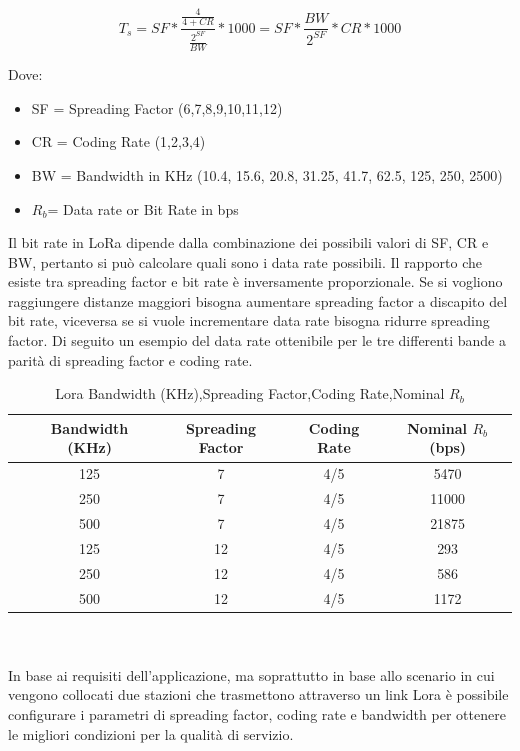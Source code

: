 \documentclass[12pt,a4paper,openright,twoside]{report}
\begin{document}
\begin{equation*} T_s = SF * \frac{\tfrac{4}{4+CR}}{\tfrac{2^{SF}}{BW}} * 1000 = SF * \frac{BW}{2^{SF}} * CR * 1000 \end{equation*}

Dove:
\begin{itemize}                       
\item SF = Spreading Factor (6,7,8,9,10,11,12)
\item CR = Coding Rate (1,2,3,4)
\item BW = Bandwidth in KHz (10.4, 15.6, 20.8, 31.25, 41.7, 62.5, 125, 250, 2500)
\item $R_b$= Data rate or Bit Rate in bps 
\end{itemize}
Il bit rate in LoRa dipende dalla combinazione dei possibili valori di SF, CR e BW, pertanto si pu\`o calcolare quali sono i data rate possibili.
Il rapporto che esiste tra spreading factor e bit rate \`e inversamente proporzionale. Se si vogliono raggiungere distanze maggiori bisogna aumentare spreading factor a discapito del bit rate, viceversa se si vuole incrementare data rate bisogna ridurre spreading factor. Di seguito un esempio del data rate ottenibile per le tre differenti bande a parit\`a di spreading factor e coding rate. 
\\
\begin{table}
\begin{center}
\begin{tabular}{lcccc}
&Bandwidth (KHz)&Spreading Factor&Coding Rate&Nominal $R_b$ (bps)\\ \hline\hline
&125&7&4/5&5470\\
\hline
&250&7&4/5&11000\\
\hline
&500&7&4/5&21875\\
\hline
&125&12&4/5&293\\
\hline
&250&12&4/5&586\\
\hline
&500&12&4/5&1172\\
\hline
\end{tabular}
\caption[Lora Bandwidth (KHz),Spreading Factor,Coding Rate,Nominal $R_b$ ]{Lora Bandwidth (KHz),Spreading Factor,Coding Rate,Nominal $R_b$ }\label{tab:quattro}
\end{center}
\end{table}
\\
\\
In base ai requisiti dell'applicazione, ma soprattutto in base allo scenario in cui vengono collocati due stazioni che trasmettono attraverso un link Lora \`e possibile configurare i parametri di spreading factor, coding rate e bandwidth per ottenere le migliori condizioni per la qualit\`a di servizio.
\end{document}
